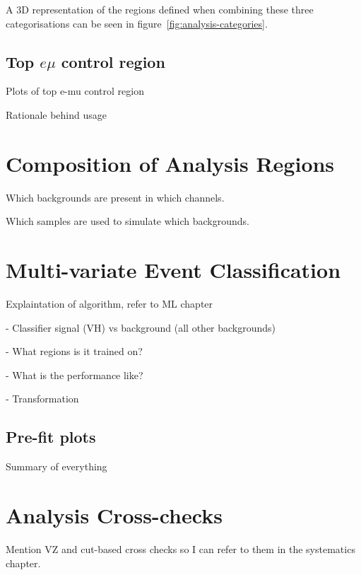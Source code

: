A 3D representation of the regions defined when combining these three
categorisations can be seen in figure~\ref{fig:analysis-categories}.


\subsection{Top \texorpdfstring{$e \mu$}{e mu} control region}%
\label{sec:topemucr}

Plots of top e-mu control region

Rationale behind usage

\section{Composition of Analysis Regions}

Which backgrounds are present in which channels.

Which samples are used to simulate which backgrounds.




\section{Multi-variate Event Classification}%
\label{sec:mva}
Explaintation of algorithm, refer to ML chapter

- Classifier signal (VH) vs background (all other backgrounds)

- What regions is it trained on?

- What is the performance like?

- Transformation






\subsection{Pre-fit plots}
Summary of everything






\section{Analysis Cross-checks}
Mention VZ and cut-based cross checks so I can refer to them in the systematics
chapter.






